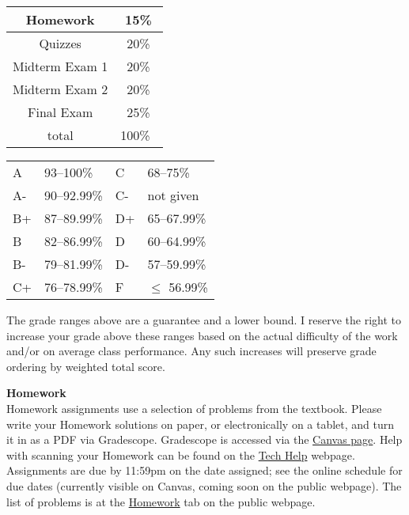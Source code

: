 \documentclass[12pt]{article}
\renewcommand{\emph}[1]{\textsf{\textbf{#1}}}
\newcommand{\localhead}[1]{\par\smallskip\textbf{#1} \smallskip\nobreak\\}%
\def\heading#1{\localhead{\large\emph{#1}}}
\begin{document}
\begin{multicols}{2}
\begin{tabular}{|c|c|}
\hline
Homework & 15\% \\
\hline
Quizzes & 20\% \\
\hline
Midterm Exam 1 & 20\% \\
\hline
Midterm Exam 2 & 20\%  \\
\hline
Final Exam & 25\% \\
\hline
total & 100\% \, \\
\hline
\end{tabular}


\begin{tabular}{llll}
A  & 93--100\%& C  & 68--75\%  \\
A- & 90--92.99\% & C- & not given \\
B+ & 87--89.99\% & D+ & 65--67.99\%  \\
B  & 82--86.99\% & D  & 60--64.99\%  \\
B- & 79--81.99\% & D- & 57--59.99\%  \\
C+ & 76--78.99\% & F  & $\le$ 56.99\%
\end{tabular}
\end{multicols}

The grade ranges above are a guarantee and a lower bound. I reserve
the right to increase your grade above these ranges based on the
actual difficulty of the work and/or on average class performance.
Any such increases will preserve grade ordering by weighted total
score.





\heading{Homework}
Homework assignments use a selection of problems from the textbook.
Please write your Homework solutions on paper, or electronically on a
tablet, and turn it in as a PDF via Gradescope.  Gradescope is
accessed via the \href{https://canvas.alaska.edu/courses/24107}{Canvas
page}.  Help with scanning your Homework can be found on the
\href{https://uaf-math251.github.io/calc2/techHelp.html}{Tech Help}
webpage.  Assignments are due by 11:59pm on the date assigned; see the
online 
schedule
for due dates (currently visible on Canvas, coming soon on the public webpage).  The list of problems is at the
\href{https://uaf-math251.github.io/calc2/homework.html}{Homework} tab
on the public webpage.
\end{document}
